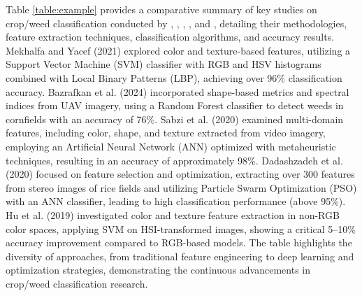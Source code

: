 \documentclass[letterpaper, notitlepage]{report}
\begin{document}
Table \ref{table:example} provides a comparative summary of key studies on crop/weed classification conducted by \cite{Mekhalfa2021-np},  \cite{Bazrafkan2024-bl}, \cite{Sabzi2020-af}, \cite{Dadashzadeh2020-pa}, and \cite{Hu2024-nv}, detailing their methodologies, feature extraction techniques, classification algorithms, and accuracy results. Mekhalfa and Yacef (2021) explored color and texture-based features, utilizing a Support Vector Machine (SVM) classifier with RGB and HSV histograms combined with Local Binary Patterns (LBP), achieving over 96\% classification accuracy. Bazrafkan et al. (2024) incorporated shape-based metrics and spectral indices from \gls{UAV} imagery, using a Random Forest classifier to detect weeds in cornfields with an accuracy of 76\%. Sabzi et al. (2020) examined multi-domain features, including color, shape, and texture extracted from video imagery, employing an Artificial Neural Network (ANN) optimized with metaheuristic techniques, resulting in an accuracy of approximately 98\%. Dadashzadeh et al. (2020) focused on feature selection and optimization, extracting over 300 features from stereo images of rice fields and utilizing Particle Swarm Optimization (PSO) with an ANN classifier, leading to high classification performance (above 95\%). Hu et al. (2019) investigated color and texture feature extraction in non-RGB color spaces, applying SVM on HSI-transformed images, showing a critical 5–10\% accuracy improvement compared to RGB-based models. The table highlights the diversity of approaches, from traditional feature engineering to deep learning and optimization strategies, demonstrating the continuous advancements in crop/weed classification research.
\end{document}
